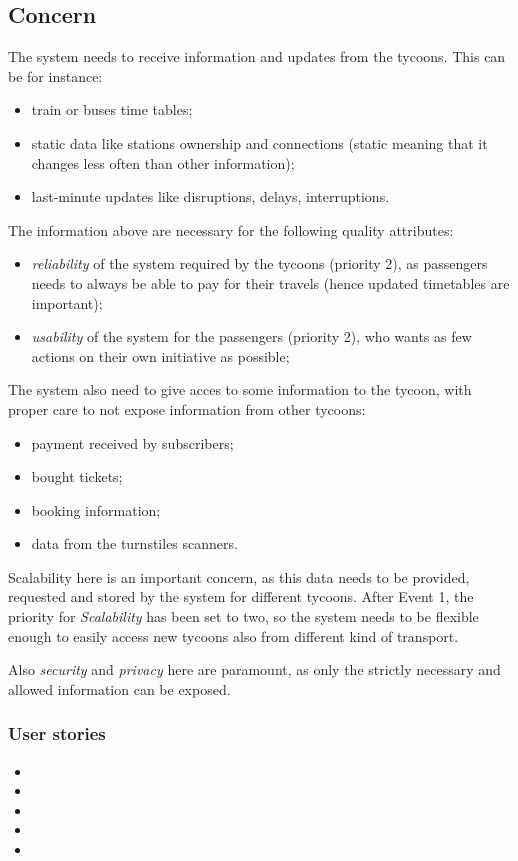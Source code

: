 \subsection*{Concern}
The system needs to receive information and updates from the tycoons. 
This can be for instance:
\begin{itemize}
    \item train or buses time tables;
    \item static data like stations ownership and connections (static meaning that it changes less often than other information);
    \item last-minute updates like disruptions, delays, interruptions.
\end{itemize}
The information above are necessary for the following quality attributes:
\begin{itemize}
    \item \textit{reliability} of the system required by the tycoons (priority 2), as passengers needs to always be able to pay for their travels (hence updated timetables are important);
    \item \textit{usability} of the system for the passengers (priority 2), who wants as few actions on their own initiative as possible;
\end{itemize}

The system also need to give acces to some information to the tycoon, with proper care to not expose information from other tycoons:
\begin{itemize}
    \item payment received by subscribers;
    \item bought tickets;
    \item booking information;
    \item data from the turnstiles scanners. 
\end{itemize}

Scalability here is an important concern, as this data needs to be provided, requested and stored by the system for different tycoons.
After Event 1, the priority for \textit{Scalability} has been set to two, so the system needs to be flexible enough to easily access new tycoons also from different kind of transport.

Also \textit{security} and \textit{privacy} here are paramount, as only the strictly necessary and allowed information can be exposed.

\subsubsection*{User stories}
\begin{itemize}[noitemsep]
    \item \userStoryTwentySix
    \item \userStoryThirtyFive
    \item \userStoryThirtySix
    \item \userStoryThirtySeven
    \item \userStoryThirtyEight
\end{itemize}

